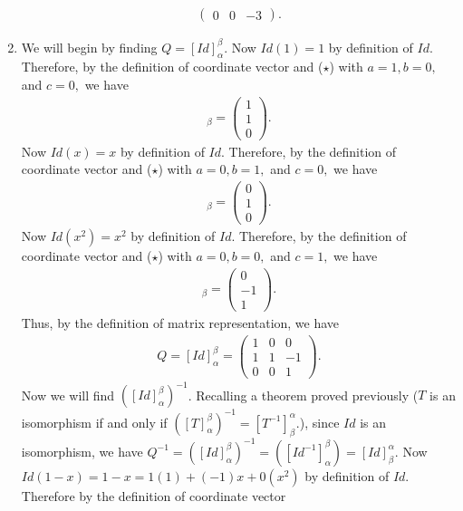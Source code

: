 \documentclass[12pt,answers]{exam}
\begin{document}
\begin{solution}
\begin{enumerate}[label=\roman*)]
\begin{align*}
\begin{pmatrix}
                                          0 & 0 & -3 \end{pmatrix}.
\end{align*}
\item  We will begin by finding $Q=[Id]^{\beta}_{\alpha}$. Now $Id(1)=1$ by definition of $Id$. Therefore, by the definition of coordinate vector and ($\star$) with $a=1,b=0,$ and $c=0,$ we have
\begin{align*}
    [Id(1)]_{\beta}=\begin{pmatrix} 1 \\ 1 \\ 0 \end{pmatrix}.
\end{align*}
Now $Id(x)=x$ by definition of $Id$. Therefore, by the definition of coordinate vector and ($\star$) with $a=0,b=1,$ and $c=0,$ we have
\begin{align*}
    [Id(x)]_{\beta}=\begin{pmatrix} 0 \\ 1 \\ 0 \end{pmatrix}.
\end{align*}
Now $Id(x^{2})=x^{2}$ by definition of $Id$. Therefore, by the definition of coordinate vector and ($\star$) with $a=0,b=0,$ and $c=1,$ we have
\begin{align*}
    [Id(x^{2})]_{\beta}=\begin{pmatrix} 0 \\ -1 \\ 1 \end{pmatrix}.
\end{align*}
Thus, by the definition of matrix representation, we have
\begin{align*}
    Q=[Id]^{\beta}_{\alpha}=\begin{pmatrix} 1 & 0 & 0 \\
                                            1 & 1 & -1 \\
                                            0 & 0 & 1 \end{pmatrix}.
\end{align*}
Now we will find $([Id]^{\beta}_{\alpha})^{-1}$. Recalling a theorem proved previously ($T$ is an isomorphism if and only if $([T]^{\beta}_{\alpha})^{-1}=[T^{-1}]^{\alpha}_{\beta}$.), since $Id$ is an isomorphism, we have $Q^{-1}=([Id]^{\beta}_{\alpha})^{-1}=([Id^{-1}]^{\beta}_{\alpha})=[Id]^{\alpha}_{\beta}$. Now $Id(1-x)=1-x=1(1)+(-1)x+0(x^{2})$ by definition of $Id$. Therefore by the definition of coordinate vector

\end{enumerate}
\end{solution}
\end{document}
